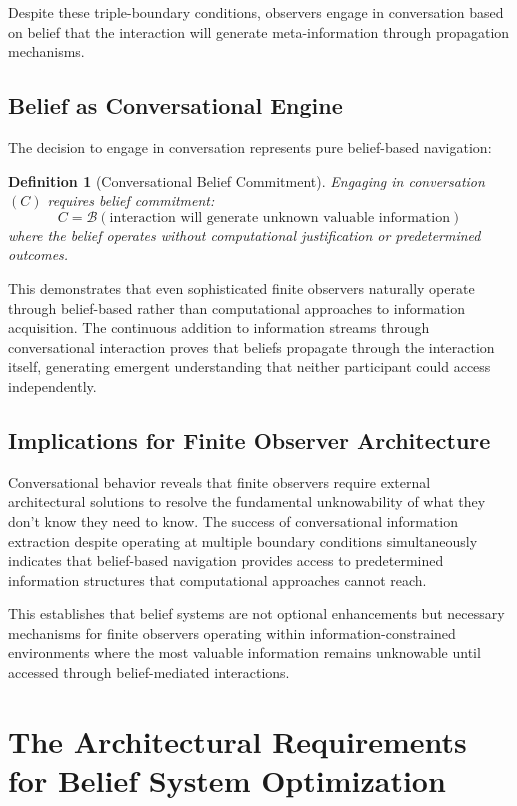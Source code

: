 \documentclass[12pt,a4paper]{article}
\newtheorem{definition}{Definition}
\begin{document}
Despite these triple-boundary conditions, observers engage in conversation based on belief that the interaction will generate meta-information through propagation mechanisms.

\subsection{Belief as Conversational Engine}

The decision to engage in conversation represents pure belief-based navigation:

\begin{definition}[Conversational Belief Commitment]
Engaging in conversation $(C)$ requires belief commitment:
$$C = \mathcal{B}(\text{interaction will generate unknown valuable information})$$
where the belief operates without computational justification or predetermined outcomes.
\end{definition}

This demonstrates that even sophisticated finite observers naturally operate through belief-based rather than computational approaches to information acquisition. The continuous addition to information streams through conversational interaction proves that beliefs propagate through the interaction itself, generating emergent understanding that neither participant could access independently.

\subsection{Implications for Finite Observer Architecture}

Conversational behavior reveals that finite observers require external architectural solutions to resolve the fundamental unknowability of what they don't know they need to know. The success of conversational information extraction despite operating at multiple boundary conditions simultaneously indicates that belief-based navigation provides access to predetermined information structures that computational approaches cannot reach.

This establishes that belief systems are not optional enhancements but necessary mechanisms for finite observers operating within information-constrained environments where the most valuable information remains unknowable until accessed through belief-mediated interactions.

\section{The Architectural Requirements for Belief System Optimization}
\end{document}
